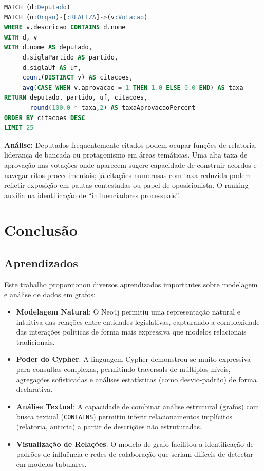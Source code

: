 \documentclass[12pt,a4paper]{article}
\begin{document}
\begin{lstlisting}[language=SQL,caption=Consulta Cypher 5]
MATCH (d:Deputado)
MATCH (o:Orgao)-[:REALIZA]->(v:Votacao)
WHERE v.descricao CONTAINS d.nome
WITH d, v
WITH d.nome AS deputado,
     d.siglaPartido AS partido,
     d.siglaUf AS uf,
     count(DISTINCT v) AS citacoes,
     avg(CASE WHEN v.aprovacao = 1 THEN 1.0 ELSE 0.0 END) AS taxa
RETURN deputado, partido, uf, citacoes,
       round(100.0 * taxa,2) AS taxaAprovacaoPercent
ORDER BY citacoes DESC
LIMIT 25
\end{lstlisting}

\textbf{Análise:} Deputados frequentemente citados podem ocupar funções de relatoria, liderança de bancada ou protagonismo em áreas temáticas. Uma alta taxa de aprovação nas votações onde aparecem sugere capacidade de construir acordos e navegar ritos procedimentais; já citações numerosas com taxa reduzida podem refletir exposição em pautas contestadas ou papel de oposicionista. O ranking auxilia na identificação de ``influenciadores processuais''.

\section{Conclusão}

\subsection{Aprendizados}

Este trabalho proporcionou diversos aprendizados importantes sobre modelagem e análise de dados em grafos:

\begin{itemize}
    \item \textbf{Modelagem Natural}: O Neo4j permitiu uma representação natural e intuitiva das relações entre entidades legislativas, capturando a complexidade das interações políticas de forma mais expressiva que modelos relacionais tradicionais.
    
    \item \textbf{Poder do Cypher}: A linguagem Cypher demonstrou-se muito expressiva para consultas complexas, permitindo traversals de múltiplos níveis, agregações sofisticadas e análises estatísticas (como desvio-padrão) de forma declarativa.
    
    \item \textbf{Análise Textual}: A capacidade de combinar análise estrutural (grafos) com busca textual (\texttt{CONTAINS}) permitiu inferir relacionamentos implícitos (relatoria, autoria) a partir de descrições não estruturadas.
    
    \item \textbf{Visualização de Relações}: O modelo de grafo facilitou a identificação de padrões de influência e redes de colaboração que seriam difíceis de detectar em modelos tabulares.
\end{itemize}
\end{document}
